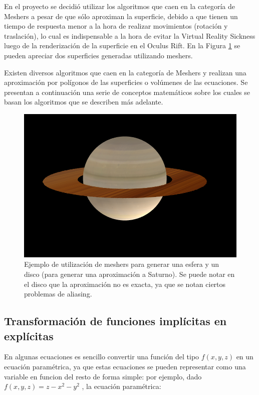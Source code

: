 \documentclass[12pt]{article}
\begin{document}
En el proyecto se decidió utilizar los algoritmos que caen en la categoría de Meshers\cite{mykola1}\cite{mykola2} a pesar de que sólo aproximan la superficie, debido a que tienen un tiempo de respuesta menor a la hora de realizar movimientos (rotación y traslación), lo cual es indispensable a la hora de evitar la Virtual Reality Sickness luego de la renderización de la superficie en el Oculus Rift. En la Figura \ref{saturno} se pueden apreciar dos superficies generadas utilizando meshers.

Existen diversos algoritmos que caen en la categoría de Meshers y realizan una aproximación por polígonos de las superficies o volúmenes de las ecuaciones. Se presentan a continuación una serie de conceptos matemáticos sobre los cuales se basan los algoritmos que se describen más adelante.
\begin{figure}[h]
\includegraphics[width=\textwidth]{saturno.png}
\caption{Ejemplo de utilización de meshers para generar una esfera y un disco (para generar una aproximación a Saturno). Se puede notar en el disco que la aproximación no es exacta, ya que se notan ciertos problemas de aliasing.}
\label{saturno}
\end{figure}
\clearpage

\subsection{Transformación de funciones implícitas en explícitas}
\noindent En algunas ecuaciones es sencillo convertir una función del tipo $f(x,y,z)$ en un ecuación paramétrica, ya que estas ecuaciones se pueden representar como una variable en funcion del resto de forma simple: por ejemplo, dado $f(x,y,z)  = z- x^2 - y^2$ , la ecuación paramétrica: 
\end{document}
